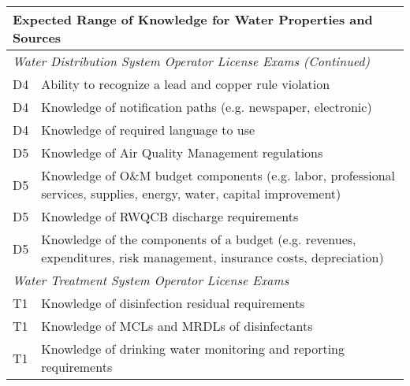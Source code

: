 \newpage



\begin{table}[H]
\begin{tabular}{| m{1cm} |m{15cm} |}
\hline
\multicolumn{2}{|l|}{\textbf{Expected   Range of Knowledge for Water Properties and Sources}}                                                                      \\ \hline
\multicolumn{2}{|l|}{\textit{Water   Distribution System Operator License Exams (Continued)}}                                                                  \\ \hline
D4 & Ability to recognize a lead and copper rule   violation                                                                   \\ \hline
D4 & Knowledge of notification paths (e.g.   newspaper, electronic)                                                            \\ \hline
D4 & Knowledge of required language to use                                                                                     \\ \hline
D5 & Knowledge of Air   Quality Management regulations                                                                         \\ \hline
D5 & Knowledge of O\&M   budget components (e.g. labor, professional services, supplies, energy,   water, capital improvement) \\ \hline
D5 & Knowledge of RWQCB   discharge requirements                                                                               \\ \hline
D5 & Knowledge of the   components of a budget (e.g. revenues, expenditures, risk management,   insurance costs, depreciation) \\ \hline
\multicolumn{2}{|l|}{\textit{Water   Treatment System Operator License Exams }}                                                                  \\ \hline
T1 & Knowledge of   disinfection residual requirements                                                                         \\ \hline
T1 & Knowledge of MCLs and   MRDLs of disinfectants                                                                            \\ \hline
T1 & Knowledge of drinking   water monitoring and reporting requirements                                                       \\ \hline

\end{tabular}
\end{table}
